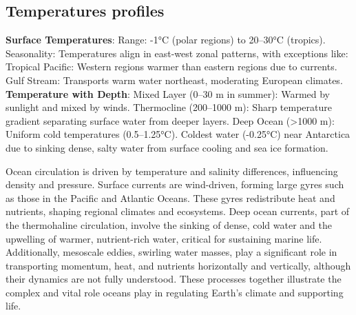 \subsection{ Temperatures profiles}
\textbf{Surface Temperatures}:
Range: -1°C (polar regions) to 20–30°C (tropics).
Seasonality: Temperatures align in east-west zonal patterns, with exceptions like:
Tropical Pacific: Western regions warmer than eastern regions due to currents.
Gulf Stream: Transports warm water northeast, moderating European climates.
\newline \textbf{Temperature with Depth}:
Mixed Layer (0–30 m in summer):
Warmed by sunlight and mixed by winds.
Thermocline (200–1000 m):
Sharp temperature gradient separating surface water from deeper layers.
Deep Ocean (>1000 m):
Uniform cold temperatures (0.5–1.25°C).
Coldest water (-0.25°C) near Antarctica due to sinking dense, salty water from surface cooling and sea ice formation.

Ocean circulation is driven by temperature and salinity differences, influencing density and pressure. Surface currents are wind-driven, forming large gyres such as those in the Pacific and Atlantic Oceans. These gyres redistribute heat and nutrients, shaping regional climates and ecosystems. Deep ocean currents, part of the thermohaline circulation, involve the sinking of dense, cold water and the upwelling of warmer, nutrient-rich water, critical for sustaining marine life.
Additionally, mesoscale eddies, swirling water masses, play a significant role in transporting momentum, heat, and nutrients horizontally and vertically, although their dynamics are not fully understood. These processes together illustrate the complex and vital role oceans play in regulating Earth's climate and supporting life.

